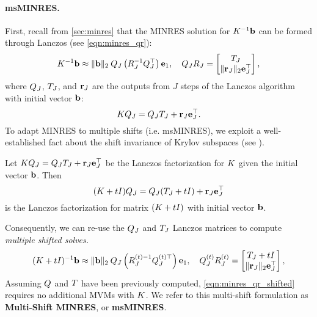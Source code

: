 \paragraph{msMINRES.}
First, recall from \cref{sec:minres} that the MINRES solution for $K^{-1} \mathbf{b}$ can be formed through Lanczos (see \cref{eqn:minres_qr}):
\begin{equation}
  K^{-1} \mathbf{b} \approx \Vert \mathbf{b} \Vert_2 \: Q_J \left( R^{-1}_J Q_J^\top \right) \mathbf{e}_1,
  \quad
  Q_J R_J = \begin{bmatrix} T_J \\ \Vert \mathbf{r}_J \Vert_2 \mathbf{e}_J^\top \end{bmatrix},
  \label{eqn:minres_qr2}
\end{equation}
where $Q_J$, $T_J$, and $\mathbf{r}_J$ are the outputs from $J$ steps of the Lanczos algorithm with initial vector $\mathbf{b}$:
\[
  K Q_J = Q_J T_J + \mathbf{r}_J \mathbf{e}_J^\top.
\]
To adapt MINRES to multiple shifts (i.e. msMINRES), we exploit a well-established fact about the shift invariance of Krylov subspaces (see \citep[e.g.][]{datta1991arnoldi,freund1990conjugate,jegerlehner1996krylov,saad2003iterative}).
%
\begin{observation}
  Let $K Q_J = Q_J T_J + \mathbf{r}_J \mathbf{e}_J^\top$ be the Lanczos factorization for $K$ given the initial vector $\mathbf{b}$.
  Then $$(K + t I) Q_J = Q_J (T_J + t I) + \mathbf{r}_J \mathbf{e}_J^\top$$ is the Lanczos factorization for matrix $(K + t I)$ with initial vector $\mathbf{b}$.
\end{observation}
%
\noindent
Consequently, we can re-use the $Q_J$ and $T_J$ Lanczos matrices to compute \emph{multiple shifted solves.}
%
\begin{equation}
  (K + t I)^{-1} \mathbf{b} \approx \Vert \mathbf{b} \Vert_2 \: Q_J \left( R^{(t){-1}}_J Q_J^{(t)\top} \right) \mathbf{e}_1,
  \quad
  Q_J^{(t)} R_J^{(t)} = \begin{bmatrix} T_J + t I \\ \Vert \mathbf{r}_J \Vert_2 \mathbf{e}_J^\top \end{bmatrix},
  \label{eqn:minres_qr_shifted}
\end{equation}
%
Assuming $Q$ and $T$ have been previously computed, \cref{eqn:minres_qr_shifted} requires no additional MVMs with $K$.
We refer to this multi-shift formulation as {\bf Multi-Shift MINRES}, or {\bf msMINRES}.

